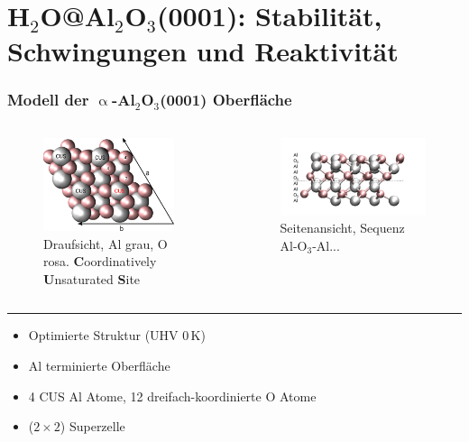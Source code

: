 \documentclass[hyperref={pdfpagelabels=false}]{beamer}
\begin{document}
\section{H$_2$O@Al$_2$O$_3$(0001): Stabilität, Schwingungen und Reaktivität}
\begin{frame}
 \frametitle{Modell der $\upalpha$-Al$_2$O$_3$(0001) Oberfläche}
 \begin{columns}
   \begin{figure}
  \includegraphics[width=0.9\textwidth]{figures/surf_0K_axes.pdf}
  \caption{Draufsicht, Al grau, O rosa. \textbf{C}oordinatively \textbf{U}nsaturated \textbf{S}ite}
  \end{figure}
  \begin{figure}
  \includegraphics[width=1.\textwidth]{figures/surf_0K-side.pdf}
  \caption{Seitenansicht, Sequenz Al-O$_3$-Al...}
  \end{figure}
  \end{columns}
 \hrule
 \begin{itemize}
  \item Optimierte Struktur (UHV $0\,$K)
  \item Al terminierte Oberfläche
  \item 4 CUS Al Atome, 12 dreifach-koordinierte O Atome
  \item ($2\times 2$) Superzelle
 \end{itemize}
\end{frame}
\end{document}
